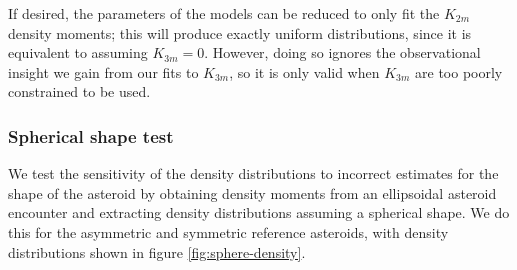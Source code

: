 \documentclass[fleqn,usenatbib]{mnras}
\begin{document}
If desired, the parameters of the models can be reduced to only fit the $K_{2m}$ density moments; this will produce exactly uniform distributions, since it is equivalent to assuming $K_{3m}=0$. However, doing so ignores the observational insight we gain from our fits to $K_{3m}$, so it is only valid when $K_{3m}$ are too poorly constrained to be used. 

\subsubsection{Spherical shape test}
\label{sec:spherical-density}
We test the sensitivity of the density distributions to incorrect estimates for the shape of the asteroid by obtaining density moments from an ellipsoidal asteroid encounter and extracting density distributions assuming a spherical shape. We do this for the asymmetric and symmetric reference asteroids, with density distributions shown in figure \ref{fig:sphere-density}.
\end{document}
